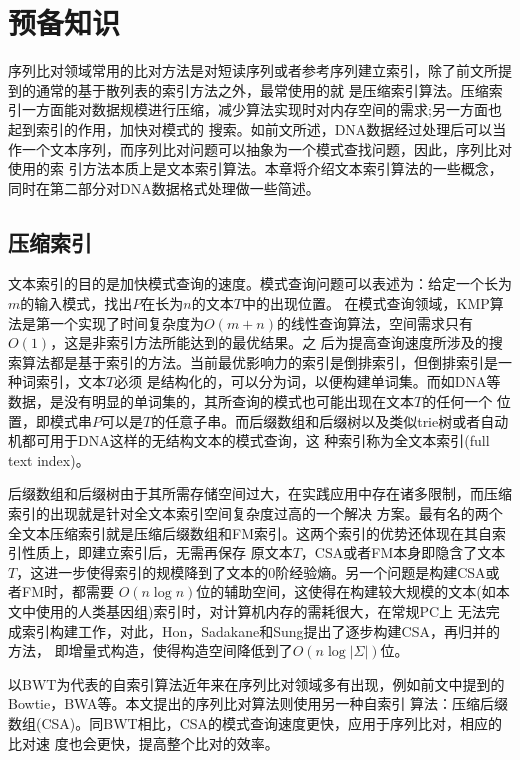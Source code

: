 \chapter{预备知识}
\label{chap:predefine}
序列比对领域常用的比对方法是对短读序列或者参考序列建立索引，除了前文所提到的通常的基于散列表的索引方法之外，最常使用的就
是压缩索引算法。压缩索引一方面能对数据规模进行压缩，减少算法实现时对内存空间的需求;另一方面也起到索引的作用，加快对模式的
搜索。如前文所述，DNA数据经过处理后可以当作一个文本序列，而序列比对问题可以抽象为一个模式查找问题，因此，序列比对使用的索
引方法本质上是文本索引算法。本章将介绍文本索引算法的一些概念，同时在第二部分对DNA数据格式处理做一些简述。

\section{压缩索引}
文本索引的目的是加快模式查询的速度。模式查询问题可以表述为：给定一个长为$m$的输入模式，找出$P$在长为$n$的文本$T$中的出现位置。
在模式查询领域，KMP算法\cite{knuth1977fast}是第一个实现了时间复杂度为$O(m+n)$的线性查询算法，空间需求只有$O(1)$，这是非索引方法所能达到的最优结果。之
后为提高查询速度所涉及的搜索算法都是基于索引的方法。当前最优影响力的索引是倒排索引，但倒排索引是一种词索引，文本$T$必须
是结构化的，可以分为词，以便构建单词集。而如DNA等数据，是没有明显的单词集的，其所查询的模式也可能出现在文本$T$的任何一个
位置，即模式串$P$可以是$T$的任意子串。而后缀数组和后缀树以及类似trie树或者自动机都可用于DNA这样的无结构文本的模式查询，这
种索引称为全文本索引(full text index)。

后缀数组和后缀树由于其所需存储空间过大，在实践应用中存在诸多限制，而压缩索引的出现就是针对全文本索引空间复杂度过高的一个解决
方案。最有名的两个全文本压缩索引就是压缩后缀数组\cite{grossi2005compressed}和FM索引\cite{ferragina2005indexing}。这两个索引的优势还体现在其自索引性质上，即建立索引后，无需再保存
原文本$T$，CSA或者FM本身即隐含了文本$T$，这进一步使得索引的规模降到了文本的0阶经验熵。另一个问题是构建CSA或者FM时，都需要
$O(n\log n)$位的辅助空间，这使得在构建较大规模的文本(如本文中使用的人类基因组)索引时，对计算机内存的需耗很大，在常规PC上
无法完成索引构建工作，对此，Hon，Sadakane和Sung提出了逐步构建CSA，再归并的方法\cite{lam2002space}\cite{hon2003constructing}，
即增量式构造，使得构造空间降低到了$O(n\log |\Sigma|)$位。

以BWT为代表的自索引算法近年来在序列比对领域多有出现，例如前文中提到的Bowtie，BWA等。本文提出的序列比对算法则使用另一种自索引
算法：压缩后缀数组(CSA)\cite{grossi2005compressed}。同BWT相比，CSA的模式查询速度更快，应用于序列比对，相应的比对速
度也会更快，提高整个比对的效率。

